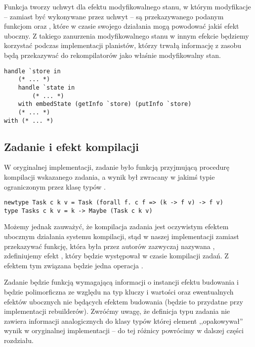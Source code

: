 

Funkcja  tworzy uchwyt dla efektu modyfikowalnego stanu, w którym modyfikacje -- zamiast być wykonywane przez uchwyt -- są przekazywanego podanym funkcjom  oraz , które w czasie swojego działania mogą powodować jakiś efekt uboczny. Z takiego zanurzenia modyfikowalnego stanu w innym efekcie będziemy korzystać podczas implementacji planistów, którzy trwałą informację z zasobu będą przekazywać do rekompilatorów jako właśnie modyfikowalny stan.

\begin{lstlisting}[language=Haleff, float=h, title={Przykład wykorzystania \helinl{embedState}}]
handle `store in
    (* ... *)
    handle `state in
        (* ... *)
    with embedState (getInfo `store) (putInfo `store)
    (* ... *)
with (* ... *)
\end{lstlisting}

\subsection{Zadanie i efekt kompilacji}

W oryginalnej implementacji, zadanie było funkcją przyjmującą procedurę kompilacji wskazanego zadania, a wynik był zwracany w jakimś typie  ograniczonym przez klasę typów .

\begin{lstlisting}[style=haskell-style]
newtype Task c k v = Task (forall f. c f => (k -> f v) -> f v)
type Tasks c k v = k -> Maybe (Task c k v)
\end{lstlisting}

Możemy jednak zauważyć, że kompilacja zadania jest oczywistym efektem ubocznym działania systemu kompilacji, stąd w naszej implementacji zamiast przekazywać funkcję, która była przez autorów zazwyczaj nazywana , zdefiniujemy efekt , który będzie występował w czasie kompilacji zadań. Z efektem tym związana będzie jedna operacja .



Zadanie będzie funkcją wymagającą informacji o instancji efektu budowania i będzie polimorficzna ze względu na typ kluczy i wartości oraz ewentualnych efektów ubocznych nie będących efektem budowania (będzie to przydatne przy implementacji rebuilderów). Zwróćmy uwagę, że definicja typu zadania nie zawiera informacji analogicznych do klasy typów  której element  ,,opakowywał'' wynik w oryginalnej implementacji -- do tej różnicy powrócimy w dalszej części rozdziału.


